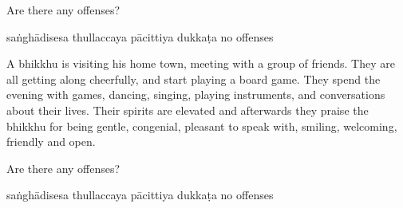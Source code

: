 \begin{exam}{\autoExamName}
\begin{problem}
  Are there any offenses?

  \begin{answers}{5}
    \bChoices
     saṅghādisesa\eAns
     thullaccaya\eAns
     pācittiya\eAns
     dukkaṭa\eAns
     no offenses\eAns
    \eChoices
  \end{answers}

\end{problem}

\problemDivide

\begin{problem}

  A bhikkhu is visiting his home town, meeting with a group of friends.
  They are all getting along cheerfully, and start playing a board game.
  They spend the evening with games, dancing, singing, playing instruments, and conversations about their lives.
  Their spirits are elevated and afterwards they praise the bhikkhu for being
  gentle, congenial, pleasant to speak with, smiling, welcoming, friendly and open.

  Are there any offenses?

  \begin{answers}{5}
    \bChoices
     saṅghādisesa\eAns
     thullaccaya\eAns
     pācittiya\eAns
     dukkaṭa\eAns
     no offenses\eAns
    \eChoices
  \end{answers}

\end{problem}


\end{exam}

